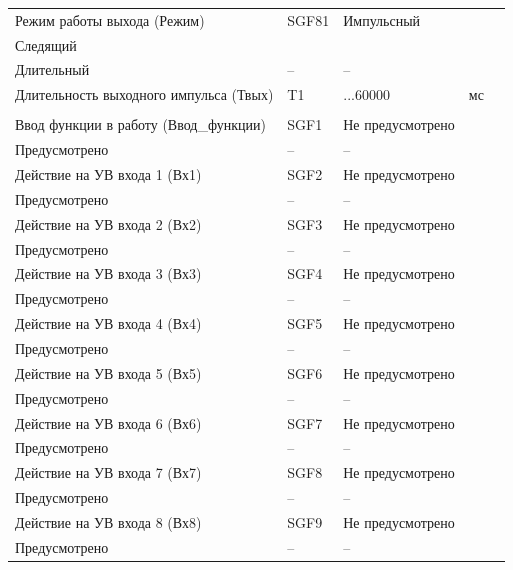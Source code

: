 \begin{longtable}{|>{\centering\arraybackslash}m{5.3cm}|>{\centering\arraybackslash}m{3.3cm}|>{\centering\arraybackslash}m{4.2cm}|>{\centering\arraybackslash}m{1.8cm}|>{\centering\arraybackslash}m{1cm}|}
\hline
\centering Режим работы выхода (Режим)  & \centering SGF81 & \centering Импульсный \\ Следящий \\ Длительный & \centering -- & \centering \arraybackslash -- \\
\hline
\centering Длительность выходного импульса (Твых)  & \centering T1 & \centering 50...60000 & \centering мс & \centering \arraybackslash 10 \\
\hline
\multicolumn{5}{|c|}{ УВ7 } \\ \hline 
\centering Ввод функции в работу (Ввод\_функции)  & \centering SGF1 & \centering Не предусмотрено \\ Предусмотрено & \centering -- & \centering \arraybackslash -- \\
\hline
\centering Действие на УВ входа 1 (Вх1)  & \centering SGF2 & \centering Не предусмотрено \\ Предусмотрено & \centering -- & \centering \arraybackslash -- \\
\hline
\centering Действие на УВ входа 2 (Вх2)  & \centering SGF3 & \centering Не предусмотрено \\ Предусмотрено & \centering -- & \centering \arraybackslash -- \\
\hline
\centering Действие на УВ входа 3 (Вх3)  & \centering SGF4 & \centering Не предусмотрено \\ Предусмотрено & \centering -- & \centering \arraybackslash -- \\
\hline
\centering Действие на УВ входа 4 (Вх4)  & \centering SGF5 & \centering Не предусмотрено \\ Предусмотрено & \centering -- & \centering \arraybackslash -- \\
\hline
\centering Действие на УВ входа 5 (Вх5)  & \centering SGF6 & \centering Не предусмотрено \\ Предусмотрено & \centering -- & \centering \arraybackslash -- \\
\hline
\centering Действие на УВ входа 6 (Вх6)  & \centering SGF7 & \centering Не предусмотрено \\ Предусмотрено & \centering -- & \centering \arraybackslash -- \\
\hline
\centering Действие на УВ входа 7 (Вх7)  & \centering SGF8 & \centering Не предусмотрено \\ Предусмотрено & \centering -- & \centering \arraybackslash -- \\
\hline
\centering Действие на УВ входа 8 (Вх8)  & \centering SGF9 & \centering Не предусмотрено \\ Предусмотрено & \centering -- & \centering \arraybackslash -- \\

\end{longtable}
